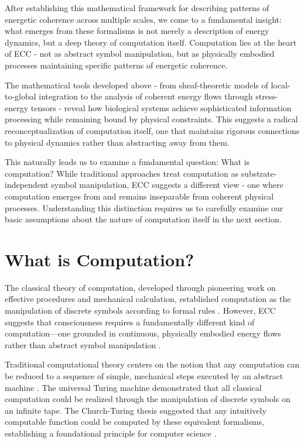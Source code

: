 \begin{refsection}
After establishing this mathematical framework for describing patterns of energetic coherence across multiple scales, we come to a fundamental insight: what emerges from these formalisms is not merely a description of energy dynamics, but a deep theory of computation itself. Computation lies at the heart of ECC - not as abstract symbol manipulation, but as physically embodied processes maintaining specific patterns of energetic coherence.

The mathematical tools developed above - from sheaf-theoretic models of local-to-global integration to the analysis of coherent energy flows through stress-energy tensors - reveal how biological systems achieve sophisticated information processing while remaining bound by physical constraints. This suggests a radical reconceptualization of computation itself, one that maintains rigorous connections to physical dynamics rather than abstracting away from them.

This naturally leads us to examine a fundamental question: What is computation? While traditional approaches treat computation as substrate-independent symbol manipulation, ECC suggests a different view - one where computation emerges from and remains inseparable from coherent physical processes. Understanding this distinction requires us to carefully examine our basic assumptions about the nature of computation itself in the next section.

\section{What is Computation?}

The classical theory of computation, developed through pioneering work on effective procedures and mechanical calculation, established computation as the manipulation of discrete symbols according to formal rules \cite{Turing1936}. However, ECC suggests that consciousness requires a fundamentally different kind of computation—one grounded in continuous, physically embodied energy flows rather than abstract symbol manipulation \cite{MacLennan2004}.

Traditional computational theory centers on the notion that any computation can be reduced to a sequence of simple, mechanical steps executed by an abstract machine \cite{Copeland2017}. The universal Turing machine demonstrated that all classical computation could be realized through the manipulation of discrete symbols on an infinite tape. The Church-Turing thesis suggested that any intuitively computable function could be computed by these equivalent formalisms, establishing a foundational principle for computer science \cite{Smith2002}.


\end{refsection}
